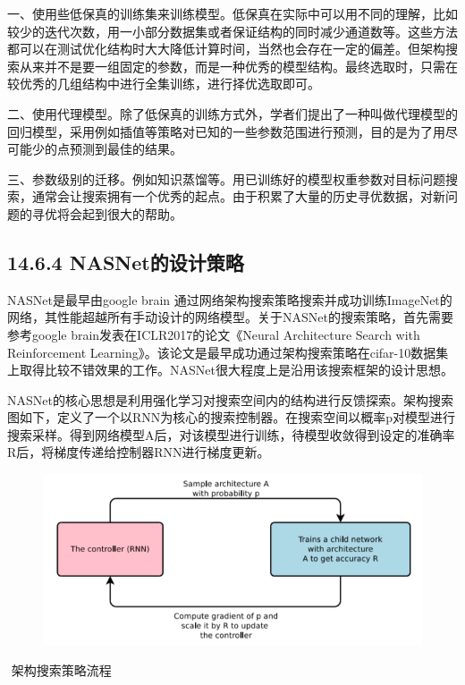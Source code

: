 一、使用些低保真的训练集来训练模型。低保真在实际中可以用不同的理解，比如较少的迭代次数，用一小部分数据集或者保证结构的同时减少通道数等。这些方法都可以在测试优化结构时大大降低计算时间，当然也会存在一定的偏差。但架构搜索从来并不是要一组固定的参数，而是一种优秀的模型结构。最终选取时，只需在较优秀的几组结构中进行全集训练，进行择优选取即可。

二、使用代理模型。除了低保真的训练方式外，学者们提出了一种叫做代理模型的回归模型，采用例如插值等策略对已知的一些参数范围进行预测，目的是为了用尽可能少的点预测到最佳的结果。

三、参数级别的迁移。例如知识蒸馏等。用已训练好的模型权重参数对目标问题搜索，通常会让搜索拥有一个优秀的起点。由于积累了大量的历史寻优数据，对新问题的寻优将会起到很大的帮助。

\subsection{14.6.4
NASNet的设计策略}\label{nasnetux7684ux8bbeux8ba1ux7b56ux7565}

NASNet是最早由google brain
通过网络架构搜索策略搜索并成功训练ImageNet的网络，其性能超越所有手动设计的网络模型。关于NASNet的搜索策略，首先需要参考google
brain发表在ICLR2017的论文《Neural Architecture Search with Reinforcement
Learning》。该论文是最早成功通过架构搜索策略在cifar-10数据集上取得比较不错效果的工作。NASNet很大程度上是沿用该搜索框架的设计思想。

NASNet的核心思想是利用强化学习对搜索空间内的结构进行反馈探索。架构搜索图如下，定义了一个以RNN为核心的搜索控制器。在搜索空间以概率p对模型进行搜索采样。得到网络模型A后，对该模型进行训练，待模型收敛得到设定的准确率R后，将梯度传递给控制器RNN进行梯度更新。

\begin{figure}
\centering
\includegraphics{./img/ch14/NAS搜索策略.png}
\caption{}
\end{figure}

​ 架构搜索策略流程

